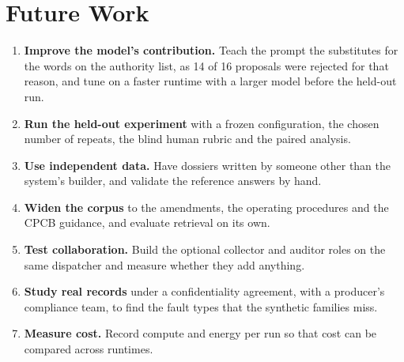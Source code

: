 \section{Future Work}
\begin{enumerate}[itemsep=3pt]
\item \textbf{Improve the model's contribution.} Teach the prompt the substitutes for the words on the
      authority list, as 14 of 16 proposals were rejected for that reason, and tune on a faster runtime with a
      larger model before the held-out run.
\item \textbf{Run the held-out experiment} with a frozen configuration, the chosen number of repeats, the blind
      human rubric and the paired analysis.
\item \textbf{Use independent data.} Have dossiers written by someone other than the system's builder, and
      validate the reference answers by hand.
\item \textbf{Widen the corpus} to the amendments, the operating procedures and the CPCB guidance, and evaluate
      retrieval on its own.
\item \textbf{Test collaboration.} Build the optional collector and auditor roles on the same dispatcher and
      measure whether they add anything.
\item \textbf{Study real records} under a confidentiality agreement, with a producer's compliance team, to
      find the fault types that the synthetic families miss.
\item \textbf{Measure cost.} Record compute and energy per run so that cost can be compared across runtimes.
\end{enumerate}

